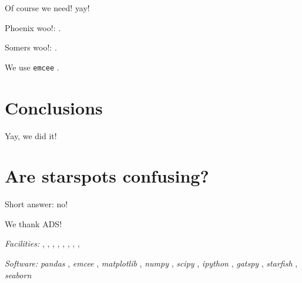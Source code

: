 \documentclass[twocolumn]{emulateapj}%
\newcommand{\iancze}{{\sc C15}}
\newcommand{\project}[1]{\textsl{#1}}
\begin{document}
Of course we need! \citet[hereafter \iancze]{czekala15}
yay!

Phoenix woo!: \citep{husser13}.

Somers woo!: \citep{somers15}.

We use \texttt{emcee} \citep{foreman13}.


\section{Conclusions}

Yay, we did it!

\clearpage
\pagebreak


\appendix

\section{Are starspots confusing?}
\label{methods-details}

Short answer: no!

\acknowledgements

We thank ADS!


{\it Facilities:} , , , , , , , , 

{\it Software: }
 \project{pandas} \citep{mckinney10},
 \project{emcee} \citep{foreman13},
 \project{matplotlib} \citep{hunter07},
 \project{numpy} \citep{vanderwalt11},
 \project{scipy} \citep{jones01},
 \project{ipython} \citep{perez07},
 \project{gatspy} \citep{JakeVanderplas2015},
 \project{starfish} \citep{czekala15},
 \project{seaborn} \citep{waskom14}

\clearpage



\end{document}
